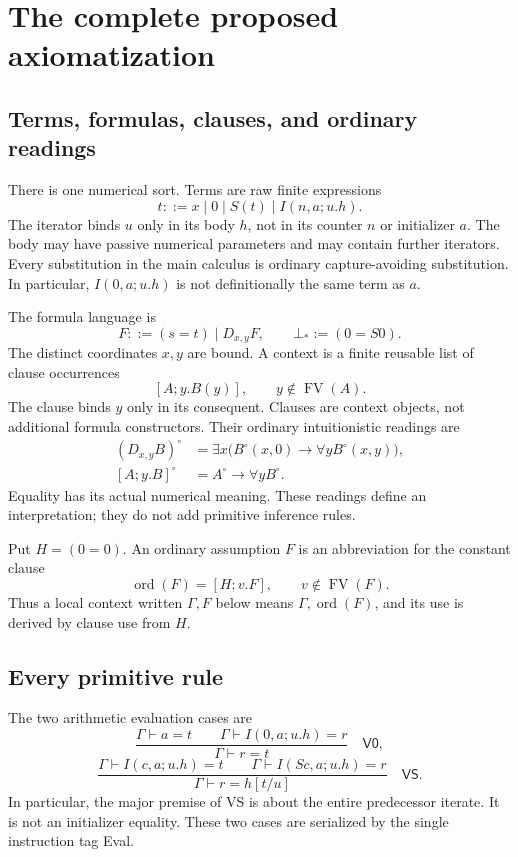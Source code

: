 \documentclass[11pt,letterpaper]{article}
\theoremstyle{definition}
\newcommand{\FV}{\operatorname{FV}}
\newcommand{\VZ}{\mathsf{V0}}
\newcommand{\VS}{\mathsf{VS}}
\newcommand{\ord}{\operatorname{ord}}
\begin{document}
\section{The complete proposed axiomatization}
\label{sec:spec}

\subsection{Terms, formulas, clauses, and ordinary readings}

There is one numerical sort. Terms are raw finite expressions
\[
     t ::= x\mid 0\mid S(t)\mid I(n,a;u.h).
\]
The iterator binds $u$ only in its body $h$, not in its counter $n$
or initializer $a$. The body may have passive numerical parameters
and may contain further iterators. Every substitution in the main
calculus is ordinary capture-avoiding substitution. In particular,
$I(0,a;u.h)$ is not definitionally the same term as $a$.

The formula language is
\[
     F ::= (s=t)\mid D_{x,y}F,
     \qquad \bot_*:=(0=S0).
\]
The distinct coordinates $x,y$ are bound. A context is a finite
reusable list of clause occurrences
\[
      [A;y.B(y)],\qquad y\notin\FV(A).
\]
The clause binds $y$ only in its consequent. Clauses are context
objects, not additional formula constructors. Their ordinary
intuitionistic readings are
\begin{align*}
 (D_{x,y}B)^\circ
   &=\exists x\bigl(B^\circ(x,0)\to\forall y B^\circ(x,y)\bigr),\\
 [A;y.B]^\circ&=A^\circ\to\forall y B^\circ.
\end{align*}
Equality has its actual numerical meaning. These readings define an
interpretation; they do not add primitive inference rules.

Put $H=(0=0)$. An ordinary assumption $F$ is an abbreviation for
the constant clause
\[
          \ord(F)=[H;v.F],\qquad v\notin\FV(F).
\]
Thus a local context written $\Gamma,F$ below means
$\Gamma,\ord(F)$, and its use is derived by clause use from $H$.

\subsection{Every primitive rule}

The two arithmetic evaluation cases are
\[
 \frac{\Gamma\vdash a=t\qquad
       \Gamma\vdash I(0,a;u.h)=r}
      {\Gamma\vdash r=t}\quad\VZ,
 \tag{V0}\label{rule:v0}
\]
\[
 \frac{\Gamma\vdash I(c,a;u.h)=t\qquad
       \Gamma\vdash I(Sc,a;u.h)=r}
      {\Gamma\vdash r=h[t/u]}\quad\VS.
 \tag{VS}\label{rule:vs}
\]
In particular, the major premise of VS is about the entire predecessor
iterate. It is not an initializer equality. These two cases are
serialized by the single instruction tag Eval.
\end{document}
